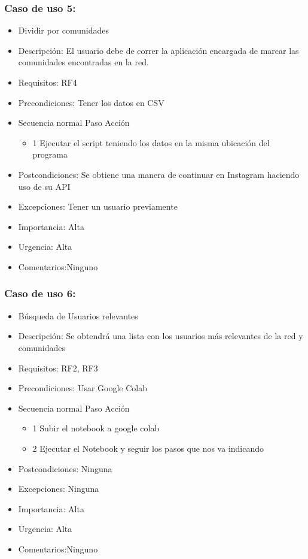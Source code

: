 \subsubsection{Caso de uso 5:}
\begin{itemize}
\item Dividir por comunidades
\item Descripción: El usuario debe de correr la aplicación encargada de marcar las comunidades encontradas en la red.
\item Requisitos: RF4
\item Precondiciones: Tener los datos en CSV
\item Secuencia normal 	Paso	 Acción
\begin{itemize}
    \item 1	Ejecutar el script teniendo los datos en la misma ubicación del programa
\end{itemize}
\item Postcondiciones: Se obtiene una manera de continuar en Instagram haciendo uso de su API
\item Excepciones: Tener un usuario previamente
\item Importancia: Alta
\item Urgencia: Alta
\item Comentarios:Ninguno
\end{itemize}


\subsubsection{Caso de uso 6:}
\begin{itemize}
\item Búsqueda de Usuarios relevantes 
\item Descripción: Se obtendrá una lista con los usuarios más relevantes de la red y comunidades
\item Requisitos: RF2, RF3
\item Precondiciones: Usar Google Colab
\item Secuencia normal 	Paso	 Acción
\begin{itemize}
    \item 1	Subir el notebook a google colab
    \item 2	Ejecutar el Notebook y seguir los pasos que nos va indicando
\end{itemize}
\item Postcondiciones: Ninguna
\item Excepciones: Ninguna
\item Importancia: Alta
\item Urgencia: Alta
\item Comentarios:Ninguno
\end{itemize}



